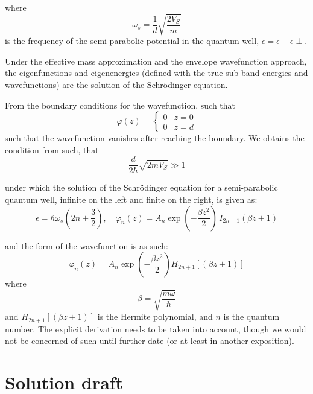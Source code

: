 where 
\begin{equation}
  \omega_s = \frac{1}{d} \sqrt{\frac{2V_S}{m}}
\end{equation}
is the frequency of the semi-parabolic potential in the quantum well, $\bar{\epsilon}= \epsilon - \epsilon{\perp}$. 
  
  
Under the effective mass approximation and the envelope wavefunction approach, the eigenfunctions and eigenenergies (defined with the true sub-band energies and wavefunctions) are the solution of the Schrödinger equation. 
  
From the boundary conditions for the wavefunction, such that
\begin{equation}
   \varphi(z) = \begin{cases}
    0 & z = 0 \\
    0 & z = d
  \end{cases}
\end{equation}
such that the wavefunction vanishes after reaching the boundary. We obtains the condition from such, that 
\begin{equation}
  \frac{d}{2\hbar} \sqrt{2m V_S} \gg 1
\end{equation}
  
under which the solution of the Schrödinger equation for a semi-parabolic quantum well, infinite on the left and finite on the right, is given as: 
\begin{equation}
  \epsilon = \hbar \omega_s \left(2n + \frac{3}{2}\right),\quad \varphi_{n}(z) = A_{n} \exp{\left(-\frac{\beta z^{2}}{2}\right)} \, I_{2n+1}\left(\beta z + 1\right)
\end{equation}
  
and the form of the wavefunction is as such: 
\begin{equation}
  \varphi_n (z) = A_n \exp{\left(- \frac{\beta z^2}{2}\right)H_{2n+1}[(\beta z + 1)]}
\end{equation}
where \begin{equation}
  \beta = \sqrt{\frac{m\omega}{\hbar}}
\end{equation}
and $H_{2n+1}[(\beta z +1)]$ is the Hermite polynomial, and $n$ is the quantum number. The explicit derivation needs to be taken into account, though we would not be concerned of such until further date (or at least in another exposition). 

\section{Solution draft}

